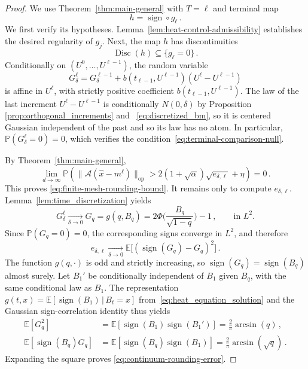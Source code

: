 \documentclass[11pt]{article}
\theoremstyle{definition}
\theoremstyle{remark}
\numberwithin{equation}{section}
\numberwithin{theorem}{section}
\newcommand{\E}{\mathbb E}
\newcommand{\Prob}{\mathbb P}
\newcommand{\op}{\mathrm{op}}
\newcommand{\cA}{\mathcal A}
\begin{document}
\begin{proof}
We use Theorem~\ref{thm:main-general} with $T=\ell$ and terminal map
\[
 h=\operatorname{sign}\circ g_{\ell}\,.
\]
We first verify its hypotheses. Lemma~\ref{lem:heat-control-admissibility} establishes the desired regularity of $g_j$. Next, the map $h$ has discontinuities 
\[
 \operatorname{Disc}(h) \subseteq\{g_{\ell}=0\}\,.
\]
Conditionally on $(U^0,\ldots,U^{\ell-1})$, the random variable
\[
 G_\delta^\ell
 =G_\delta^{\ell-1}
 +b(t_{\ell-1},U^{\ell-1})(U^\ell-U^{\ell-1})
\]
is affine in $U^\ell$, with strictly positive coefficient
$b(t_{\ell-1},U^{\ell-1})$. The law of the last increment $U^{\ell} - U^{\ell-1}$ is conditionally $N(0,\delta)$ by Proposition \ref{prop:orthogonal_increments} and ~\eqref{eq:discretized_bm}, so it is centered Gaussian independent of the past and so its law has no atom. In particular, $\Prob(G_\delta^\ell=0)=0$, which verifies the condition~\eqref{eq:terminal-comparison-null}.

By Theorem~\ref{thm:main-general},
\[
 \lim_{d\to\infty}
 \Prob\left(
 \bigl\|\cA(\widehat x-m^\ell)\bigr\|_{\op}
 >
 2(1+\sqrt\alpha)\sqrt{e_{\delta,\ell}}+\eta
 \right)=0\,.
\]
This proves \eqref{eq:finite-mesh-rounding-bound}.
%
It remains only to compute $e_{\delta,\ell}$. Lemma~\ref{lem:time_discretization} yields 
\[
 G_\delta^\ell\xrightarrow[\delta \to 0]{} G_q = g(q,B_q)=2 \Phi\Big(\frac{B_q}{\sqrt{1-q}}\Big)-1\,,
 \qquad\text{in }L^2.
\]
Since $\Prob(G_q=0)=0$, the corresponding signs converge in $L^2$, and therefore
\[
 e_{\delta,\ell}\xrightarrow[\delta \to 0]{}
 \E\bigl[(\operatorname{sign}(G_q)-G_q)^2\bigr]\,.
\]
The function $g(q,\cdot)$ is odd and strictly increasing, so
$\operatorname{sign}(G_q)=\operatorname{sign}(B_q)$ almost surely.
Let $B_1'$ be conditionally independent of $B_1$ given $B_q$, with the same conditional law as $B_1$. The representation $g(t,x) = \E[\operatorname{sign}(B_1)\,|\,B_t = x]$ from~\eqref{eq:heat_equation_solution} and the Gaussian sign-correlation identity thus yields
\begin{align*}
 \E[G_q^2]
 &=
 \E[\operatorname{sign}(B_1)\operatorname{sign}(B_1')]
 =
 \frac{2}{\pi}\arcsin(q)\,,\\
 \E[\operatorname{sign}(B_q)G_q]
 &=
 \E[\operatorname{sign}(B_q)\operatorname{sign}(B_1)]
 =
 \frac{2}{\pi}\arcsin(\sqrt q)\,.
\end{align*}
Expanding the square proves \eqref{eq:continuum-rounding-error}.  
\end{proof}

\end{document}

